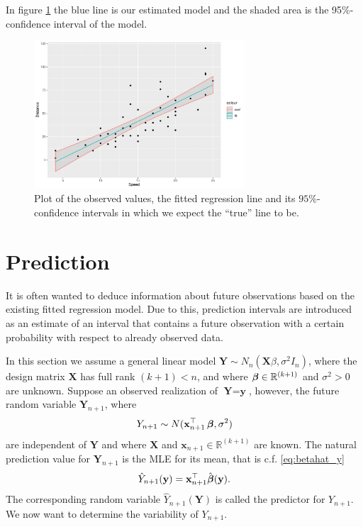 \begin{example} 
In figure \ref{fig:t_distributionplot2} the blue line is our estimated model and the shaded area is the 95\%-confidence interval of the model. 
\begin{figure}[H]
    \centering
    \includegraphics[width = 0.7\textwidth]{figures/Nanna/Konfidensinterval.pdf}
    \caption{Plot of the observed values, the fitted regression line and its $95\%$-confidence intervals in which we expect the ``true'' line to be.}
    \label{fig:t_distributionplot2}
\end{figure}
\end{example}

\section{Prediction}
It is often wanted to deduce information about future observations based on the existing fitted regression model. 
Due to this, prediction intervals are introduced as an estimate of an interval that contains a future observation with a certain probability with respect to already observed data.

In this section we assume a general linear model $\textbf{Y}\sim N_n(\textbf{X}\beta, \sigma^2 I_n)$, where the design matrix $\textbf{X}$ has full rank $(k+1)<n$, and where $\operatorname{\boldsymbol{\beta}} \in \mathbb{R}^{(k+1)}$ and $\sigma^2>0$ are unknown. Suppose an observed realization of $\textbf{Y}=\textbf{y}$, however, the future random variable $\textbf{Y}_{n+1}$, where
\begin{align*}
    Y_{n+1}\sim N(\textbf{x}^\top_{n+1}\operatorname{\boldsymbol{\beta}},\sigma^2)
\end{align*}
are independent of $\textbf{Y}$ and where $\textbf{X}$ and $\textbf{x}_{n+1}\in\mathbb{R}^{(k+1)}$ are known. 
The natural prediction value for $\textbf{Y}_{n+1}$ is the MLE for its mean, that is c.f. \eqref{eq:betahat_y}
\begin{align*}
    \hat{Y}_{n+1}(\textbf{y})=\textbf{x}^\top_{n+1}\hat{\operatorname{\boldsymbol{\beta}}}(\textbf{y}).
\end{align*}
The corresponding random variable $\hat{Y}_{n+1}(\textbf{Y})$ is called the predictor for $Y_{n+1}$. 
We now want to determine the variability of $Y_{n+1}$.

